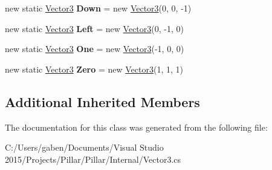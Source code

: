 \begin{DoxyCompactItemize}
new static \hyperlink{class_pillar3_d_1_1_vector3}{Vector3} {\bfseries Down} = new \hyperlink{class_pillar3_d_1_1_vector3}{Vector3}(0, 0, -\/1)
\item 
\mbox{\label{class_pillar3_d_1_1_vector3_a8cbeef4bf46be68324fc01a54e143373}} 
new static \hyperlink{class_pillar3_d_1_1_vector3}{Vector3} {\bfseries Left} = new \hyperlink{class_pillar3_d_1_1_vector3}{Vector3}(0, -\/1, 0)
\item 
\mbox{\label{class_pillar3_d_1_1_vector3_a4ec6880b35fb7c5d5b08995ccaa64b6b}} 
new static \hyperlink{class_pillar3_d_1_1_vector3}{Vector3} {\bfseries One} = new \hyperlink{class_pillar3_d_1_1_vector3}{Vector3}(-\/1, 0, 0)
\item 
\mbox{\label{class_pillar3_d_1_1_vector3_ac522dc75adc0b8fd966a305a606a6156}} 
new static \hyperlink{class_pillar3_d_1_1_vector3}{Vector3} {\bfseries Zero} = new \hyperlink{class_pillar3_d_1_1_vector3}{Vector3}(1, 1, 1)
\end{DoxyCompactItemize}
\subsection*{Additional Inherited Members}


The documentation for this class was generated from the following file\+:\begin{DoxyCompactItemize}
\item 
C\+:/\+Users/gaben/\+Documents/\+Visual Studio 2015/\+Projects/\+Pillar/\+Pillar/\+Internal/Vector3.\+cs\end{DoxyCompactItemize}
